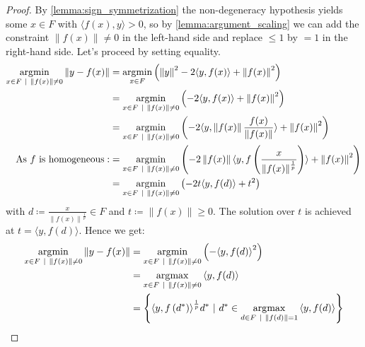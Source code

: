 \begin{proof}

By \autoref{lemma:sign_symmetrization} the non-degeneracy hypothesis yields
some \(x \in F\) with \({\langle f(x),y\rangle} > 0\), so by
\autoref{lemma:argument_scaling} we can add the constraint
\(\left\| {f(x)} \right\| \neq 0\) in the left-hand side and replace
\(\leq 1\) by \(= 1\) in the right-hand side. Let's proceed by setting
equality. \[\begin{aligned}
\operatorname*{\arg\!\min}_{x \in F~|~\left\| {f(x)} \right\| \neq 0}\left\| {y - f(x)} \right\| & = \operatorname*{\arg\!\min}_{x \in F}\left( \left\| y \right\|^{2} - 2{\langle y,f(x)\rangle}+ \left\| {f(x)} \right\|^{2}  \right) \\
 & = \operatorname*{\arg\!\min}_{x \in F~|~\left\| {f(x)} \right\| \neq 0}\left( - 2{\langle y,f(x)\rangle} + \left\| {f(x)} \right\|^{2} \right) \\
 & = \operatorname*{\arg\!\min}_{x \in F~|~\left\| {f(x)} \right\| \neq 0}\left( - 2{\langle y,\left\| {f(x)} \right\|\frac{f(x)}{\left\| {f(x)} \right\|}\rangle} + \left\| {f(x)} \right\|^{2} \right) \\
\text{As}\ f\ \text{is}\ \text{homogeneous}: & = \operatorname*{\arg\!\min}_{x \in F~|~\left\| {f(x)} \right\| \neq 0}\left( - 2\left\| {f(x)} \right\|{\langle y,f\left( \frac{x}{\left\| {f(x)} \right\|^{\frac{1}{p}}} \right)\rangle} + \left\| {f(x)} \right\|^{2} \right) \\
 & = \operatorname*{\arg\!\min}_{x \in F~|~\left\| {f(x)} \right\| \neq 0}\left( - 2t{\langle y,f(d)\rangle} + t^{2} \right)
\end{aligned}\] with
\(d \coloneqq \frac{x}{\left\| {f(x)} \right\|^{\frac{1}{p}}} \in F\)
and \(t \coloneqq \left\| {f(x)} \right\| \geq 0\). The solution over
\(t\) is achieved at \(t = {\langle y,f(d)\rangle}\). Hence we get:
\[\begin{aligned}
\operatorname*{\arg\!\min}_{x \in F~|~\left\| {f(x)} \right\| \neq 0}\left\| {y - f(x)} \right\| & = \operatorname*{\arg\!\min}_{x \in F~|~\left\| {f(x)} \right\| \neq 0}\left( - {\langle y,f(d)\rangle}^{2} \right) \\
 & = \operatorname*{\arg\!\max}_{x \in F~|~\left\| {f(x)} \right\| \neq 0}{\langle y,f(d)\rangle} \\
 & = \left\{ {\langle y,f\left( d^{\ast} \right)\rangle}^{\frac{1}{p}}d^{\ast}~|~d^{\ast} \in \operatorname*{\arg\!\max}_{d \in F~|~\left\| {f(d)} \right\| = 1}{\langle y,f(d)\rangle} \right\}
\end{aligned}\]

\end{proof}

